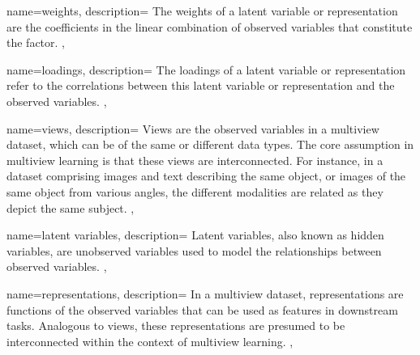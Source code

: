  {
    name={weights},
    description={
        The weights of a latent variable or representation are the coefficients in the linear combination of observed variables that constitute the factor.
    },
}

 {
    name={loadings},
    description={
        The loadings of a latent variable or representation refer to the correlations between this latent variable or representation and the observed variables.
    },
}

 {
    name={views},
    description={
        Views are the observed variables in a multiview dataset, which can be of the same or different data types. The core assumption in multiview learning is that these views are interconnected. For instance, in a dataset comprising images and text describing the same object, or images of the same object from various angles, the different modalities are related as they depict the same subject.
    },
}

 {
    name={latent variables},
    description={
        Latent variables, also known as hidden variables, are unobserved variables used to model the relationships between observed variables.
    },
}

 {
    name={representations},
    description={
        In a multiview dataset, representations are functions of the observed variables that can be used as features in downstream tasks. Analogous to views, these representations are presumed to be interconnected within the context of multiview learning.
    },
}
